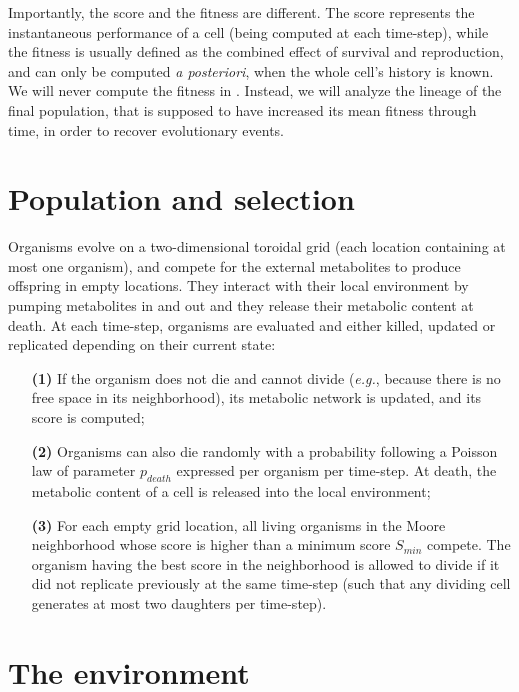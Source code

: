 Importantly, the score and the fitness are different. The score represents the instantaneous performance of a cell (being computed at each time-step), while the fitness is usually defined as the combined effect of survival and reproduction, and can only be computed \textit{a posteriori}, when the whole cell's history is known. We will never compute the fitness in {\EvoEvoSim}. Instead, we will analyze the lineage of the final population, that is supposed to have increased its mean fitness through time, in order to recover evolutionary events.


\section{Population and selection}
\label{sec:part2:methodology:population_selection}

Organisms evolve on a two-dimensional toroidal grid (each location containing at most one organism), and compete for the external metabolites to produce offspring in empty locations. They interact with their local environment by pumping metabolites in and out and they release their metabolic content at death. At each time-step, organisms are evaluated and either killed, updated or replicated depending on their current state:
\begin{enumerate}
\item[\textbf{(1)}] If the organism does not die and cannot divide (\textit{e.g.}, because there is no free space in its neighborhood), its metabolic network is updated, and its score is computed;
\item[\textbf{(2)}] Organisms can also die randomly with a probability following a Poisson law of parameter $p_{death}$ expressed per organism per time-step. At death, the metabolic content of a cell is released into the local environment;
\item[\textbf{(3)}] For each empty grid location, all living organisms in the Moore neighborhood whose score is higher than a minimum score $S_{min}$ compete. The organism having the best score in the neighborhood is allowed to divide if it did not replicate previously at the same time-step (such that any dividing cell generates at most two daughters per time-step).
\end{enumerate}


\section{The environment}
\label{sec:part2:methodology:environment}

